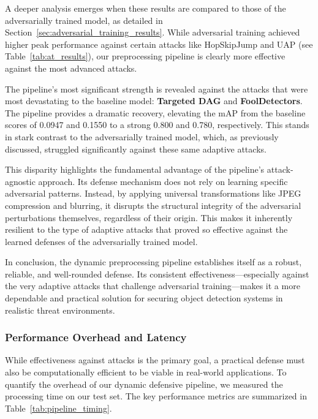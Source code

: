 \documentclass[../main.tex]{subfiles}
\begin{document}
A deeper analysis emerges when these results are compared to those of the adversarially trained model, as detailed in Section~\ref{sec:adversarial_training_results}. While adversarial training achieved higher peak performance against certain attacks like HopSkipJump and UAP (see Table~\ref{tab:at_results}), our preprocessing pipeline is clearly more effective against the most advanced attacks.

The pipeline's most significant strength is revealed against the attacks that were most devastating to the baseline model: \textbf{Targeted DAG} and \textbf{FoolDetectors}. The pipeline provides a dramatic recovery, elevating the mAP from the baseline scores of 0.0947 and 0.1550 to a strong 0.800 and 0.780, respectively. This stands in stark contrast to the adversarially trained model, which, as previously discussed, struggled significantly against these same adaptive attacks.

This disparity highlights the fundamental advantage of the pipeline's attack-agnostic approach. Its defense mechanism does not rely on learning specific adversarial patterns. Instead, by applying universal transformations like JPEG compression and blurring, it disrupts the structural integrity of the adversarial perturbations themselves, regardless of their origin. This makes it inherently resilient to the type of adaptive attacks that proved so effective against the learned defenses of the adversarially trained model.

In conclusion, the dynamic preprocessing pipeline establishes itself as a robust, reliable, and well-rounded defense. Its consistent effectiveness—especially against the very adaptive attacks that challenge adversarial training—makes it a more dependable and practical solution for securing object detection systems in realistic threat environments.


\subsubsection{Performance Overhead and Latency}

While effectiveness against attacks is the primary goal, a practical defense must also be computationally efficient to be viable in real-world applications. To quantify the overhead of our dynamic defensive pipeline, we measured the processing time on our test set. The key performance metrics are summarized in Table~\ref{tab:pipeline_timing}.
\end{document}
